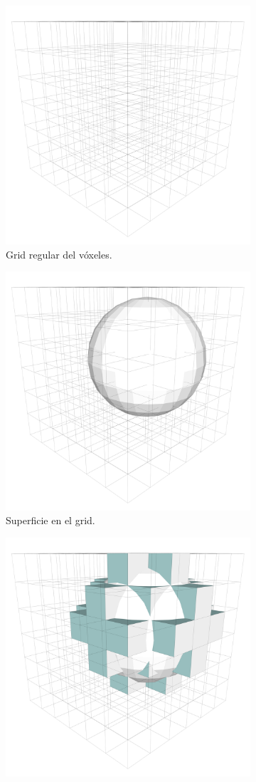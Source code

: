 \begin{figure}[H]
	\centering
	\begin{subfigure}{0.33\textwidth}
		\centering
		\includegraphics[width=.6\linewidth]{media/rigid01.pdf}
		\captionsetup{width=0.95\textwidth}
		\caption{Grid regular del vóxeles.}
	\end{subfigure}%
	\begin{subfigure}{0.33\textwidth}
		\centering
		\includegraphics[width=.6\linewidth]{media/rigid02.pdf}
		\captionsetup{width=0.95\textwidth}
		\caption{Superficie en el grid.}
	\end{subfigure}%
	\begin{subfigure}{0.33\textwidth}
		\centering
		\includegraphics[width=.6\linewidth]{media/rigid03.pdf}

\end{subfigure}
\end{figure}
